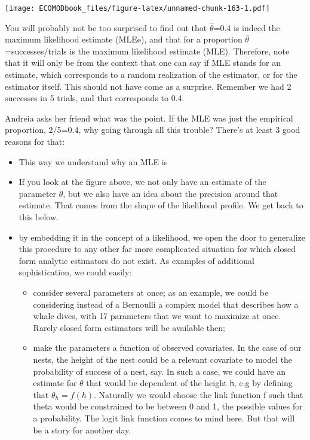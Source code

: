 \documentclass[
]{book}
\providecommand{\tightlist}{%
  \setlength{\itemsep}{0pt}\setlength{\parskip}{0pt}}
\begin{document}
\texttt{[image: ECOMODbook\_files/figure-latex/unnamed-chunk-163-1.pdf]}

You will probably not be too surprised to find out that \(\hat \theta\)=0.4 is indeed the maximum likelihood estimate (MLEe), and that for a proportion \(\hat \theta\)=successes/trials is the maximum likelihood estimate (MLE). Therefore, note that it will only be from the context that one can say if MLE stands for an estimate, which corresponds to a random realization of the estimator, or for the estimator itself. This should not have come as a surprise. Remember we had 2 successes in 5 trials, and that corresponds to 0.4.

Andreia asks her friend what was the point. If the MLE was just the empirical proportion, 2/5=0.4, why going through all this trouble? There's at least 3 good reasons for that:

\begin{itemize}
\tightlist
\item
  This way we understand why an MLE is
\item
  If you look at the figure above, we not only have an estimate of the parameter \(\theta\), but we also have an idea about the precision around that estimate. That comes from the shape of the likelihood profile. We get back to this below.
\item
  by embedding it in the concept of a likelihood, we open the door to generalize this procedure to any other far more complicated situation for which closed form analytic estimators do not exist. As examples of additional sophistication, we could easily:

  \begin{itemize}
  \tightlist
  \item
    consider several parameters at once; as an example, we could be considering instead of a Bernoulli a complex model that describes how a whale dives, with 17 parameters that we want to maximize at once. Rarely closed form estimators will be available then;
  \item
    make the parameters a function of observed covariates. In the case of our nests, the height of the nest could be a relevant covariate to model the probability of success of a nest, say. In such a case, we could have an estimate for \(\theta\) that would be dependent of the height \texttt{h}, e.g by defining that \(\theta_h=f(h)\). Naturally we would choose the link function f such that theta would be constrained to be between 0 and 1, the possible values for a probability. The logit link function comes to mind here. But that will be a story for another day.
  \end{itemize}
\end{itemize}
\end{document}

